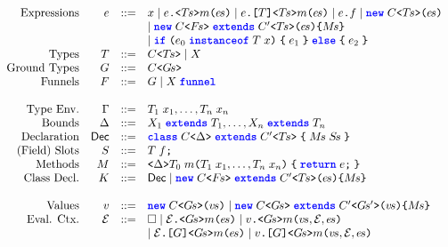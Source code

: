 \begin{figure}
\vspace{-1em}
\[
\begin{array}{rrcl}
\textrm{Expressions} & e & ::= & x \mid \call{e}{\pl{T}}{m}{\pl{e}} \mid \explicitcall{e}{T}{\pl{T}}{m}{\pl{e}}
    \mid e\fstop f
    \mid \obj{C}{\pl{T}}{\pl{e}}\\
    &&&\mid \innerobj{C}{\pl{F}}{C'}{\pl{T}}{\pl{e}}{\pl{M}}\\
    &&& \mid \ifthen{e_0}{T}{x}{e_1}{e_2}\\
\textrm{Types} & T & ::= & \gen{C}{\pl{T}} \mid X\\
\textrm{Ground Types} & G & ::= & \gen{C}{\pl{G}}\\
\textrm{Funnels} & F & ::= & G \mid \funnel{X}\\
\\
\textrm{Type Env.} & \Gamma & ::= & T_1\gap x_1,\ldots,T_n\gap x_n\\
\textrm{Bounds} & \Delta & ::= & \ext{X_1}{T_1},\ldots,\ext{X_n}{T_n}\\
\textrm{Declaration} & \mathsf{Dec} & ::= & \subclass{C}{\Delta}{C'}{\pl{T}}{\pl{M}}{\pl{S}}\\
\textrm{(Field) Slots} & S & ::= & T\gap f\semi\\
\textrm{Methods} & M & ::= & \method{\Delta}{T_0}{m}{T_1\gap x_1,\ldots,T_n\gap x_n}{\ret{e}}\\
\textrm{Class Decl.} & K & ::= & \mathsf{Dec} \mid \innerobj{C}{\pl{F}}{C'}{\pl{T}}{\pl{e}}{\pl{M}}\\
%
\\
\textrm{Values} & v & ::= & \obj{C}{\pl{G}}{\pl{v}} \mid \innerobj{C}{\pl{G}}{C'}{\pl{G}'}{\pl{v}}{\pl{M}}\\
\textrm{Eval. Ctx.} & \mathcal{E} & ::= & \square \mid \call{\mathcal{E}}{\pl{G}}{m}{\pl{e}} \mid \call{v}{\pl{G}}{m}{\pl{v},\mathcal{E},\pl{e}}\\
    &&& \mid \explicitcall{\mathcal{E}}{G}{\pl{G}}{m}{\pl{e}} \mid \explicitcall{v}{G}{\pl{G}}{m}{\pl{v},\mathcal{E},\pl{e}}\\

\end{array}\]
\end{figure}
